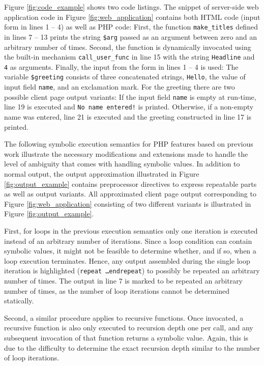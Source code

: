 \documentclass[sigconf]{acmart}
\begin{document}
Figure \ref{fig:code_example} shows two code listings. The snippet of server-side web
application code in Figure \ref{fig:web_application} contains both HTML code
(input form in lines 1 -- 4) as well as PHP code: First, the function
\texttt{make\_titles} defined in lines 7 – 13 prints the string \texttt{\$arg} 
passed as an argument between zero and an arbitrary number of times. Second, the
function is dynamically invocated using the built-in mechanism
\texttt{call\_user\_func} in line 15 with the string \texttt{Headline} and \texttt{4} as arguments.  
Finally, the input from the form in lines 1 – 4 is used: The variable \texttt{\$greeting} consists of three concatenated strings,
\texttt{Hello}, the value of input field \texttt{name}, and an exclamation mark.
For the greeting there are two possible client page output
variants: If the input field \texttt{name} is empty at run-time, line 19 is
executed and \texttt{No name entered!} is printed. Otherwise, if a non-empty
name was entered, line 21 is executed and the greeting constructed in line 17 is printed.

The following symbolic execution semantics for PHP features based on
previous work \cite{Nguyen:2014:BCG:2635868.2635928} illustrate the necessary
modifications and extensions made to handle the level of ambiguity that comes with handling symbolic values. 
In addition to normal output, the output approximation illustrated in
Figure \ref{fig:output_example} contains preprocessor directives to express
repeatable parts as well as output variants. All approximated client page
output corresponding to Figure \ref{fig:web_application} consisting of two
different variants is illustrated in Figure \ref{fig:output_example}.

First, for loops in the previous execution semantics
\cite{Nguyen:2014:BCG:2635868.2635928} only one iteration is executed instead of
an arbitrary number of iterations. Since a loop condition can contain symbolic
values, it might not be feasible to determine whether, and if so, when a loop
execution terminates. Hence, any output assembled during the single loop
iteration is highlighted (\texttt{repeat \ldots endrepeat}) to possibly be
repeated an arbitrary number of times. The output in line 7 is marked to be
repeated an arbitrary number of times, as the number of loop iterations cannot
be determined statically. 

Second, a similar procedure applies to recursive
functions. Once invocated, a recursive function is also only executed to
recursion depth one per call, and any subsequent invocation of that function returns a
symbolic value. Again, this is due to the difficulty to determine the exact
recursion depth similar to the number of loop iterations.
\end{document}
